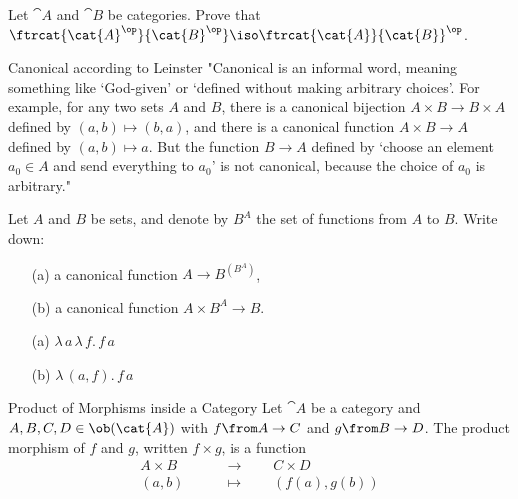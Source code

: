 \begin{exercise}
        Let $\cat{A}$ and $\cat{B}$ be categories.  Prove that
        $\ftrcat{\cat{A}^\op}{\cat{B}^\op} \iso \ftrcat{\cat{A}}{\cat{B}}^\op$.
\end{exercise}

\begin{definition}{Canonical according to Leinster}
  "Canonical is an informal word, meaning something like `God-given' or
  `defined without making arbitrary choices'.  For example, for any two sets
  $A$ and $B$, there is a canonical bijection $A \times B \to B \times A$
  defined by $(a, b) \mapsto (b, a)$, and there is a canonical function $A
  \times B \to A$ defined by $(a, b) \mapsto a$.  But the function $B \to A$
  defined by `choose an element $a_0 \in A$ and send everything to $a_0$' is
  not canonical, because the choice of $a_0$ is arbitrary."
\end{definition}

\begin{exercise}
  Let $A$ and $B$ be sets, and denote by $B^A$ the set of functions from $A$
  to $B$.  Write down:
  \begin{itemize}
  \item[(a)] a canonical function $A \to B^{(B^A)}$,
  \item[(b)] a canonical function $A \times B^{A} \to B$.
  \end{itemize}
\end{exercise}
\begin{answer}
    \begin{itemize}
        \item[(a)] $\lambda\, a\, \lambda\,f.\, f\,a$
        \item[(b)] $\lambda\, (a, f).\, f\,a$
    \end{itemize}
\end{answer}

\begin{definition}{Product of Morphisms inside a Category}
  Let $\cat{A}$ be a category and $A, B, C, D \in \ob(\cat{A})$ with $f \from A \to C$ and $g \from B \to D$.
  The product morphism of $f$ and $g$, written $f \times g$, is a function
  \begin{align*}
    A \times B &\qquad\to\qquad C \times D\\
    (a, b) &\qquad\mapsto\qquad (f(a), g(b))
  \end{align*}
\end{definition}

\newcommand{\eval}[1]{\ensuremath{\mathsf{eval}^{#1}\xspace}}

